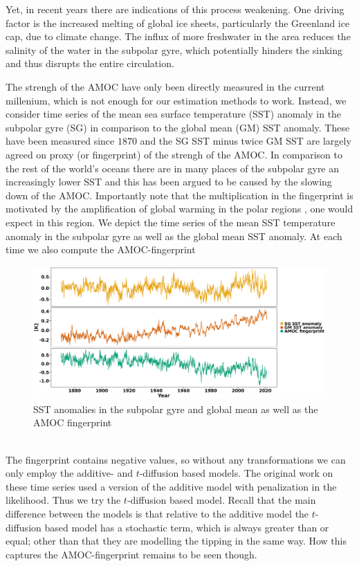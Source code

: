 Yet, in recent years there are indications of this process weakening. One driving factor is the increased melting of global ice sheets, particularly the Greenland ice cap, due to climate change. The influx of more freshwater in the area reduces the salinity of the water in the subpolar gyre, which potentially hinders the sinking and thus disrupts the entire circulation. 

The strengh of the AMOC have only been directly measured in the current millenium, which is not enough for our estimation methods to work. Instead, we consider time series of the mean sea surface temperature (SST) anomaly in the subpolar gyre (SG) in comparison to the global mean (GM) SST anomaly. These have been measured since $1870$ and the SG SST minus twice GM SST are largely agreed on proxy (or fingerprint) of the strengh of the AMOC. In comparison to the rest of the world's oceans there are in many places of the subpolar gyre an increasingly lower SST and this has been argued to be caused by the slowing down of the AMOC. Importantly note that the multiplication in the fingerprint is motivated by the amplification of global warming in the polar regions \cite[caption of figure 1]{Ditlevsen2023}, one would expect in this region.
\newpage
\noindent We depict the time series of the mean SST temperature anomaly in the subpolar gyre as well as the global mean SST anomaly. At each time we also compute the AMOC-fingerprint
\begin{figure}[h!]
    \begin{center}
    \includegraphics[scale = .06]{figures/AMOC_data_plot.jpeg}
    \caption{SST anomalies in the subpolar gyre and global mean as well as the AMOC fingerprint}
    \label{figure:AMOC_plot}
    \end{center}
\end{figure}\\
The fingerprint contains negative values, so without any transformations we can only employ the additive- and $t$-diffusion based models. The original work on these time series \cite{Ditlevsen2023} used a version of the additive model with penalization in the likelihood. Thus we try the $t$-diffusion based model. Recall that the main difference between the models is that relative to the additive model the $t$-diffusion based model has a stochastic term, which is always greater than or equal; other than that they are modelling the tipping in the same way. How this captures the AMOC-fingerprint remains to be seen though.
